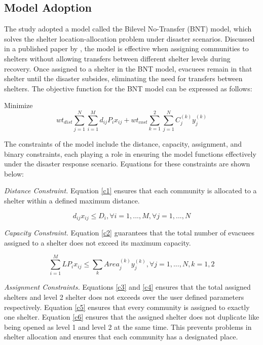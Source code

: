 \documentclass[11pt,letterpaper,]{article}
\begin{document}
	\subsection{Model Adoption}
	
	The study adopted a model called the Bilevel No-Transfer (BNT) model, which solves the shelter location-allocation problem under disaster scenarios. Discussed in a published paper by \textcite{LeahUP}, the model is effective when assigning communities to shelters without allowing transfers between different shelter levels during recovery. Once assigned to a shelter in the BNT model, evacuees remain in that shelter until the disaster subsides, eliminating the need for transfers between shelters. The objective function for the BNT model can be expressed as follows:
	
	Minimize 
	\begin{equation}
		wt_{dist}\sum_{j=1}^{N}\sum_{i=1}^{M}d_{ij}P_{i}x_{ij}+wt_{cost}\sum_{k=1}^{2}\sum_{j=1}^{N}C_{j}^{(k)}y_{j}^{(k)} 
	\end{equation}
	
	The constraints of the model include the distance, capacity, assignment, and binary constraints, each playing a role in ensuring the model functions effectively under the disaster response scenario. Equations for these constraints are shown below:
	
	\textit{Distance Constraint.} Equation \ref{c1} ensures that each community is allocated to a shelter within a defined maximum distance. 
	
	\begin{equation} 	
		\label{c1}
		d_{ij}x_{ij} \le D_{i}, \forall i = 1,..., M,  \forall j = 1,..., N 
	\end{equation}
	
	\textit{Capacity Constraint.} Equation \ref{c2} guarantees that the total number of evacuees assigned to a shelter does not exceed its maximum capacity. 
	
	\begin{equation} 
		\label{c2}
		\sum_{i=1}^{M}LP_{i}x_{ij} \le \sum_{k} Area_{j}^{(k)} y_{j}^{(k)}, \forall j = 1,..., N , k=1,2
	\end{equation}
	
	\textit{Assignment Constraints.} Equations \ref{c3} and \ref{c4} ensures that the total assigned shelters and level 2 shelter does not exceeds over the user defined parameters respectively.  Equation \ref{c5} ensures that every community is assigned to exactly one shelter. Equation \ref{c6} ensures that the assigned shelter does not duplicate like being opened as level 1 and level 2 at the same time. This prevents problems in shelter allocation and ensures that each community has a designated place.
	
\end{document}
